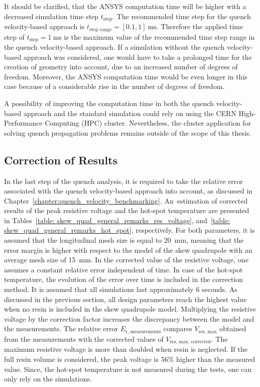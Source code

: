 It should be clarified, that the ANSYS computation time will be higher with a decreased simulation time step $t_\text{step}$. The recommended time step for the quench velocity-based approach is $t_\text{step range} = [0.1, 1]~\text{ms}$. Therefore the applied time step of $t_\text{step}=1~\text{ms}$ is the maximum value of the recommended time step range in the quench velocity-based approach. If a simulation without the quench velocity-based approach was considered, one would have to take a prolonged time for the creation of geometry into account, due to an increased number of degrees of freedom. Moreover, the ANSYS computation time would be even longer in this case because of a considerable rise in the number of degrees of freedom. 

A possibility of improving the computation time in both the quench velocity-based approach and the standard simulation could rely on using the CERN High-Performance Computing (HPC) cluster. Nevertheless, the cluster application for solving quench propagation problems remains outside of the scope of this thesis.


\subsection{Correction of Results}

In the last step of the quench analysis, it is required to take
the relative error associated with the quench velocity-based approach into account, as discussed in Chapter~\ref{chapter:quench_velocity_benchmarking}. An~estimation of corrected results of the peak resistive voltage and the hot-spot temperature are presented in Tables~\ref{table: skew_quad_general_remarks_res_voltage}, and~\ref{table: skew_quad_general_remarks_hot_spot}, respectively. For both parameters, it is assumed that the longitudinal mesh size is equal to 20~mm, meaning that the error margin is higher with respect to the model of the skew quadrupole with an average mesh size of 15~mm. In the corrected value of the resistive voltage, one assumes a constant relative error independent of time. In case of the hot-spot temperature, the evolution of the error over time is included in the correction method. It is assumed that all simulations last approximately 6 seconds. As discussed in the previous section, all design parameters reach the highest value when no resin is included in the skew quadrupole model. Multiplying the resistive voltage by the correction factor increases the discrepancy between the model and the measurements. The relative error $E_\text{r, measurements}$ compares $V_\text{res, max}$ obtained from the measurements with the corrected values of $V_\text{res, max, corrected}$. The maximum resistive voltage is more than doubled when resin is neglected. If the full resin volume is considered, the peak voltage is 56\% higher than the measured value. Since, the hot-spot temperature is not measured during the tests, one can only rely on the simulations.

